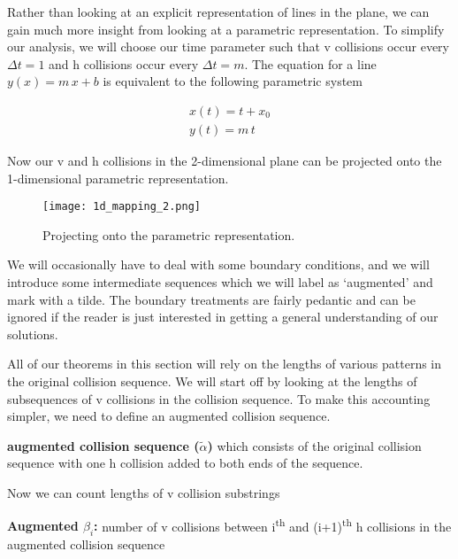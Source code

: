 
Rather than looking at an explicit representation of lines in the plane, we can gain much more insight from looking at a parametric representation. To simplify our analysis, we will choose our time parameter such that v collisions occur every $\Delta t = 1$ and h collisions occur every $\Delta t = m$. The equation for a line $y(x) = m \, x + b$ is equivalent to the following parametric system

\begin{align}\label{eq:parametric-line}
	x(t) = t + x_0\\
	y(t) = m \, t
\end{align}

Now our v and h collisions in the 2-dimensional plane can be projected onto the 1-dimensional parametric representation.

\begin{figure}[H]
  \begin{center}
    \texttt{[image: 1d\_mapping\_2.png]}
  \end{center}
  \vspace{-.2in} %
  \caption{\label{fig:1d-projection} Projecting onto the parametric representation.}
\end{figure}

We will occasionally have to deal with some boundary conditions, and we will introduce some intermediate sequences which we will label as `augmented' and mark with a tilde. The boundary treatments are fairly pedantic and can be ignored if the reader is just interested in getting a general understanding of our solutions.

All of our theorems in this section will rely on the lengths of various patterns in the original collision sequence. We will start off by looking at the lengths of subsequences of v collisions in the collision sequence. To make this accounting simpler, we need to define an augmented collision sequence.

\begin{definition}
	\textbf{augmented collision sequence ($\tilde{\alpha}$)} which consists of the original collision sequence with one h collision added to both ends of the sequence.
\end{definition}

Now we can count lengths of v collision substrings

\begin{definition}
	\textbf{Augmented $\beta_i$:} number of v collisions between i\textsuperscript{th} and (i+1)\textsuperscript{th} h collisions in the augmented collision sequence
\end{definition}

